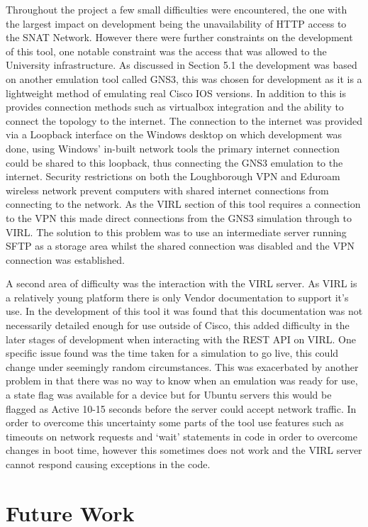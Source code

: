 \documentclass[11pt]{report}
\begin{document}
Throughout the project a few small difficulties were encountered, the one with the largest impact on development being the unavailability of HTTP access to the SNAT Network. However there were further constraints on the development of this tool, one notable constraint was the access that was allowed to the University infrastructure. As discussed in Section 5.1 the development was based on another emulation tool called GNS3, this was chosen for development as it is a lightweight method of emulating real Cisco IOS versions. In addition to this is provides connection methods such as virtualbox integration and the ability to connect the topology to the internet. The connection to the internet was provided via a Loopback interface on the Windows desktop on which development was done, using Windows' in-built network tools the primary internet connection could be shared to this loopback, thus connecting the GNS3 emulation to the internet. Security restrictions on both the Loughborough VPN and Eduroam wireless network prevent computers with shared internet connections from connecting to the network. As the VIRL section of this tool requires a connection to the VPN this made direct connections from the GNS3 simulation through to VIRL. The solution to this problem was to use an intermediate server running SFTP as a storage area whilst the shared connection was disabled and the VPN connection was established.

A second area of difficulty was the interaction with the VIRL server. As VIRL is a relatively young platform there is only Vendor documentation to support it's use. In the development of this tool it was found that this documentation was not necessarily detailed enough for use outside of Cisco, this added difficulty in the later stages of development when interacting with the REST API on VIRL. One specific issue found was the time taken for a simulation to go live, this could change under seemingly random circumstances. This was exacerbated by another problem in that there was no way to know when an emulation was ready for use, a state flag was available for a device but for Ubuntu servers this would be flagged as Active 10-15 seconds before the server could accept network traffic. In order to overcome this uncertainty some parts of the tool use features such as timeouts on network requests and `wait' statements in code in order to overcome changes in boot time, however this sometimes does not work and the VIRL server cannot respond causing exceptions in the code.

\section{Future Work}
\end{document}
